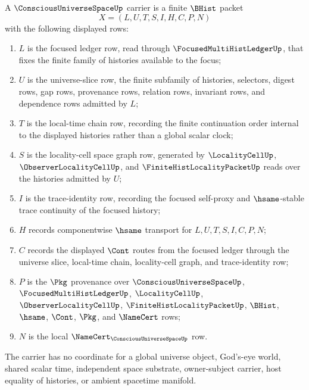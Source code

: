 \begin{definition}
\label{def:conscious-universe-space-carrier}
A $\ConsciousUniverseSpaceUp$ carrier is a finite $\BHist$ packet
$$
X=(L,U,T,S,I,H,C,P,N)
$$
with the following displayed rows:
\begin{enumerate}
\item $L$ is the focused ledger row, read through $\FocusedMultiHistLedgerUp$, that fixes the finite family of histories available to the focus;
\item $U$ is the universe-slice row, the finite subfamily of histories, selectors, digest rows, gap rows, provenance rows, relation rows, invariant rows, and dependence rows admitted by $L$;
\item $T$ is the local-time chain row, recording the finite continuation order internal to the displayed histories rather than a global scalar clock;
\item $S$ is the locality-cell space graph row, generated by $\LocalityCellUp$, $\ObserverLocalityCellUp$, and $\FiniteHistLocalityPacketUp$ reads over the histories admitted by $U$;
\item $I$ is the trace-identity row, recording the focused self-proxy and $\hsame$-stable trace continuity of the focused history;
\item $H$ records componentwise $\hsame$ transport for $L,U,T,S,I,C,P,N$;
\item $C$ records the displayed $\Cont$ routes from the focused ledger through the universe slice, local-time chain, locality-cell graph, and trace-identity row;
\item $P$ is the $\Pkg$ provenance over $\ConsciousUniverseSpaceUp$, $\FocusedMultiHistLedgerUp$, $\LocalityCellUp$, $\ObserverLocalityCellUp$, $\FiniteHistLocalityPacketUp$, $\BHist$, $\hsame$, $\Cont$, $\Pkg$, and $\NameCert$ rows;
\item $N$ is the local $\NameCert_{\ConsciousUniverseSpaceUp}$ row.
\end{enumerate}
The carrier has no coordinate for a global universe object, God's-eye world, shared scalar time, independent space substrate, owner-subject carrier, host equality of histories, or ambient spacetime manifold.
\end{definition}

